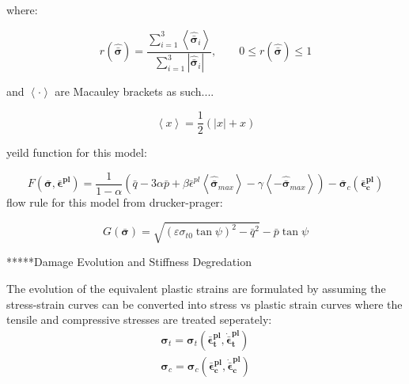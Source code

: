 where:

\begin{equation}
r\left(\hat{\boldsymbol{\bar{\sigma}}}\right)=\frac{\sum_{i=1}^{3}\left\langle \hat{\boldsymbol{\bar{\sigma}}}_{i}\right\rangle }{\sum_{i=1}^{3}\left|\hat{\boldsymbol{\bar{\sigma}}}_{i}\right|},\qquad0\leq r\left(\hat{\boldsymbol{\bar{\sigma}}}\right)\leq1\label{eqn:const9-2}
\end{equation}


and $\left\langle \cdotp\right\rangle $ are Macauley brackets as
such....

\begin{equation}
\left\langle x\right\rangle =\frac{1}{2}\left(\left|x\right|+x\right)\label{eqn:const9-3}
\end{equation}


yeild function for this model:

\begin{equation}
F\left(\boldsymbol{\bar{\sigma}},\boldsymbol{\bar{\epsilon}^{pl}}\right)=\frac{1}{1-\alpha}\left(\bar{q}-3\alpha\bar{p}+\beta\bar{\epsilon}^{pl}\left\langle \hat{\boldsymbol{\bar{\sigma}}}_{max}\right\rangle -\gamma\left\langle -\hat{\boldsymbol{\bar{\sigma}}}_{max}\right\rangle \right)-\bar{\boldsymbol{\sigma}}_{c}\left(\boldsymbol{\bar{\epsilon}_{c}^{pl}}\right)\label{eqn:const10}
\end{equation}
flow rule for this model from drucker-prager:

\begin{equation}
G\left(\boldsymbol{\bar{\sigma}}\right)=\sqrt{\left(\varepsilon\sigma_{t0}\tan\psi\right)^{2}-\bar{q}^{2}}-\bar{p}\tan\psi\label{eqn:const11}
\end{equation}


{*}{*}{*}{*}{*}Damage Evolution and Stiffness Degredation

The evolution of the equivalent plastic strains are formulated by
assuming the stress-strain curves can be converted into stress vs
plastic strain curves where the tensile and compressive stresses are
treated seperately: 
\begin{equation}
\begin{aligned}
\boldsymbol{\sigma}_{t}=\boldsymbol{\sigma}_{t}\left(\boldsymbol{\bar{\epsilon}_{t}^{pl}},\boldsymbol{\dot{\bar{\epsilon}}_{t}^{pl}}\right)\\
\boldsymbol{\sigma}_{c}=\boldsymbol{\sigma}_{c}\left(\boldsymbol{\bar{\epsilon}_{c}^{pl}},\boldsymbol{\dot{\bar{\epsilon}}_{c}^{pl}}\right)
\end{aligned}
\label{eqn:dam1}
\end{equation}


